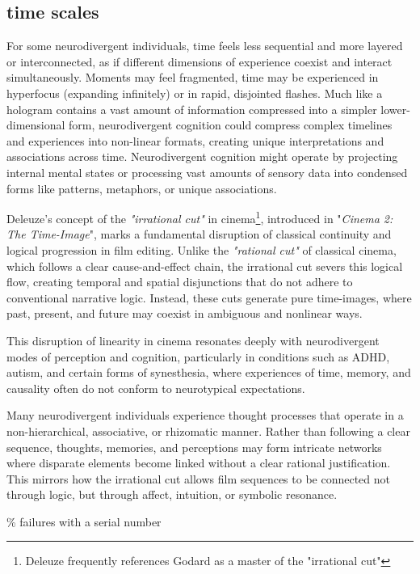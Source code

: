 \subsection*{time scales}

For some neurodivergent individuals, time feels less sequential and more layered or interconnected, as if different dimensions of experience coexist and interact simultaneously. Moments may feel fragmented, time may be experienced in hyperfocus (expanding infinitely) or in rapid, disjointed flashes. Much like a hologram contains a vast amount of information compressed into a simpler lower-dimensional form, neurodivergent cognition could compress complex timelines and experiences into non-linear formats, creating unique interpretations and associations across time.
Neurodivergent cognition might operate by projecting internal mental states or processing vast amounts of sensory data into condensed forms like patterns, metaphors, or unique associations. 

Deleuze's concept of the \textit{"irrational cut"} in cinema\footnote{Deleuze frequently references Godard as a master of the "irrational cut"}, introduced in "\textit{Cinema 2: The Time-Image}"\citep{deleuze1985}, marks a fundamental disruption of classical continuity and logical progression in film editing. Unlike the \textit{"rational cut"} of classical cinema, which follows a clear cause-and-effect chain, the irrational cut severs this logical flow, creating temporal and spatial disjunctions that do not adhere to conventional narrative logic. Instead, these cuts generate pure time-images, where past, present, and future may coexist in ambiguous and nonlinear ways.

This disruption of linearity in cinema resonates deeply with neurodivergent modes of perception and cognition, particularly in conditions such as ADHD, autism, and certain forms of synesthesia, where experiences of time, memory, and causality often do not conform to neurotypical expectations.

Many neurodivergent individuals experience thought processes that operate in a non-hierarchical, associative, or rhizomatic manner. Rather than following a clear sequence, thoughts, memories, and perceptions may form intricate networks where disparate elements become linked without a clear rational justification. This mirrors how the irrational cut allows film sequences to be connected not through logic, but through affect, intuition, or symbolic resonance.
 
{\scriptsize \textcolor{comment}{\% failures with a serial number}}

